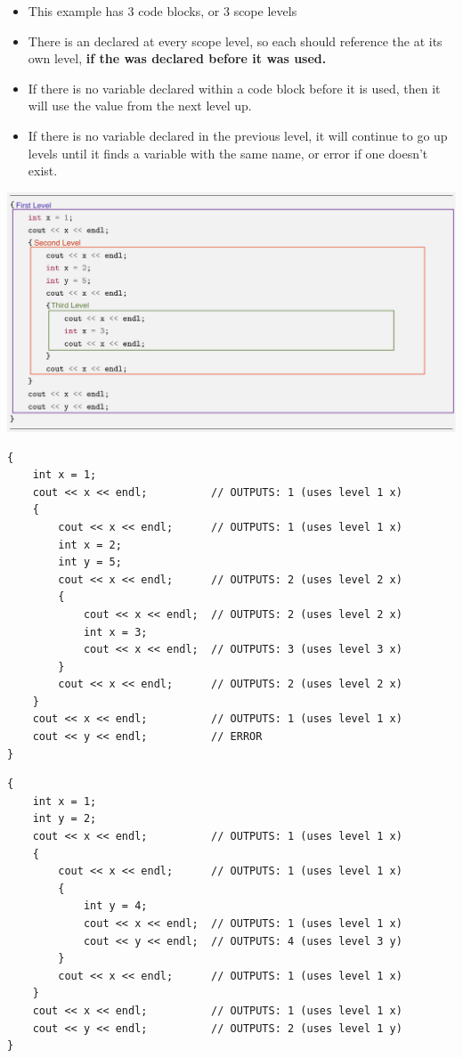 \begin{itemize}
\tightlist
    \item This example has 3 code blocks, or 3 scope levels
    \item There is an  declared at every scope level, so each  should reference the  at its own level, \textbf{if the  was declared before it was used.}
    \item If there is no variable declared within a code block before it is used, then it will use the value from the next level up. 
    \item If there is no variable declared in the previous level, it will continue to go up levels until it finds a variable with the same name, or error if one doesn't exist.
\end{itemize}

\includegraphics[width=6in]{images/scoping_rules.png}


\begin{verbatim}
{
    int x = 1;
    cout << x << endl;          // OUTPUTS: 1 (uses level 1 x)
    {
        cout << x << endl;      // OUTPUTS: 1 (uses level 1 x)
        int x = 2;
        int y = 5;
        cout << x << endl;      // OUTPUTS: 2 (uses level 2 x)
        {
            cout << x << endl;  // OUTPUTS: 2 (uses level 2 x)
            int x = 3;
            cout << x << endl;  // OUTPUTS: 3 (uses level 3 x)
        }
        cout << x << endl;      // OUTPUTS: 2 (uses level 2 x) 
    }
    cout << x << endl;          // OUTPUTS: 1 (uses level 1 x)
    cout << y << endl;          // ERROR
}
\end{verbatim}


\begin{verbatim}
{
    int x = 1;
    int y = 2;
    cout << x << endl;          // OUTPUTS: 1 (uses level 1 x)
    {
        cout << x << endl;      // OUTPUTS: 1 (uses level 1 x)
        {
            int y = 4;
            cout << x << endl;  // OUTPUTS: 1 (uses level 1 x)
            cout << y << endl;  // OUTPUTS: 4 (uses level 3 y)
        }
        cout << x << endl;      // OUTPUTS: 1 (uses level 1 x)
    }
    cout << x << endl;          // OUTPUTS: 1 (uses level 1 x)
    cout << y << endl;          // OUTPUTS: 2 (uses level 1 y)
}
\end{verbatim}

